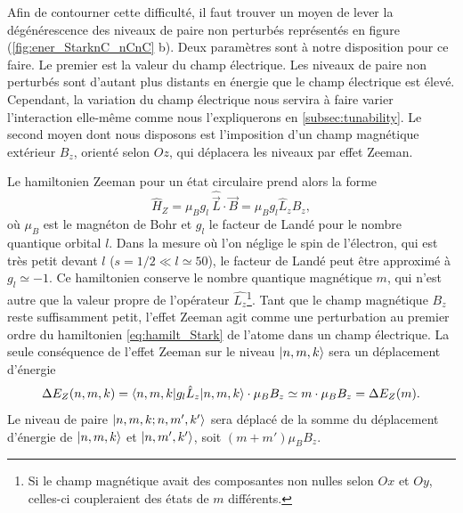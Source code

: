 Afin de contourner cette difficulté, il faut trouver un moyen de lever la dégénérescence des niveaux de paire non perturbés représentés en figure (\ref{fig:ener_StarknC_nCnC} b).
Deux paramètres sont à notre disposition pour ce faire.
Le premier est la valeur du champ électrique.
Les niveaux de paire non perturbés sont d'autant plus distants en énergie que le champ électrique est élevé.
Cependant, la variation du champ électrique nous servira à faire varier l'interaction elle-même comme nous l'expliquerons en \ref{subsec:tunability}.
Le second moyen dont nous disposons est l'imposition d'un champ magnétique extérieur $B_z$, orienté selon $Oz$, qui déplacera les niveaux par effet Zeeman.

Le hamiltonien Zeeman pour un état circulaire prend alors la forme%
\begin{equation}
\label{eq:H_Zeeman}
\hat{H}_Z = \mu_B g_l~\hat{\vec{L}}\cdot\vec{B} = \mu_B g_l\hat{L}_zB_z,
\end{equation}
où $\mu_B$ est le magnéton de Bohr et $g_l$ le facteur de Landé pour le nombre quantique orbital $l$.
Dans la mesure où l'on néglige le spin de l'électron, qui est très petit devant $l$ ($s=1/2 \ll l\simeq 50$), le facteur de Landé peut être approximé à $g_l \simeq -1$.
Ce hamiltonien conserve le nombre quantique magnétique $m$, qui n'est autre que la valeur propre de l'opérateur $\hat{L_z}$\footnote{
Si le champ magnétique avait des composantes non nulles selon $Ox$ et $Oy$, celles-ci coupleraient des états de $m$ différents.}.
Tant que le champ magnétique $B_z$ reste suffisamment petit, l'effet Zeeman agit comme une perturbation au premier ordre du hamiltonien \eqref{eq:hamilt_Stark} de l'atome dans un champ électrique.
La seule conséquence de l'effet Zeeman sur le niveau $\ket{n,m,k}$ sera un déplacement d'énergie
\begin{equation}
\label{eq:Zeeman_shift}
\Delta E_Z (n,m,k) = \braket{n,m,k|g_l \hat{L}_z | n,m,k}\cdot \mu_B B_z \simeq m\cdot \mu_B B_z = \Delta E_Z (m).
\end{equation}
Le niveau de paire $\ket{n,m,k ; n,m',k'}$ sera déplacé de la somme du déplacement d'énergie de $\ket{n,m,k}$ et $\ket{n,m',k'}$, soit $(m+m')\mu_B B_z$.

